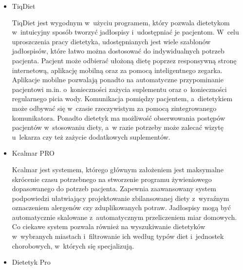\begin{itemize}
    \item TiqDiet

        TiqDiet\cite{url:TiqDiet} jest wygodnym w~użyciu programem, który pozwala dietetykom w~intuicyjny sposób tworzyć jadłospisy i~udostępniać je pacjentom.
        W~celu uproszczenia pracy dietetyka, udostępnianych jest wiele szablonów jadłospisów, które łatwo można dostosować do indywidualnych potrzeb pacjenta.
        Pacjent może odbierać ułożoną dietę poprzez responsywną stronę internetową, aplikację mobilną oraz za pomocą inteligentnego zegarka.
        Aplikacje mobilne pozwalają ponadto na automatyczne przypominanie pacjentowi m.in. o~konieczności zażycia suplementu oraz o~konieczności regularnego picia wody.
        Komunikacja pomiędzy pacjentem, a~dietetykiem może odbywać się w~czasie rzeczywistym za pomocą zintegrowanego komunikatora.
        Ponadto dietetyk ma możliwość obserwowania postępów pacjentów w~stosowaniu diety, a~w razie potrzeby może zalecać wizytę u~lekarza czy też zażycie dodatkowych suplementów.
%
    \item Kcalmar PRO

        Kcalmar\cite{url:kcalmar} jest systemem, którego głównym założeniem jest maksymalne skrócenie czasu potrzebnego na stworzenie programu żywieniowego dopasowanego do potrzeb pacjenta.
        Zapewnia zaawansowany system podpowiedzi ułatwiający projektowanie zbilansowanej diety z~wyraźnym oznaczeniem alergenów czy zduplikowanych potraw.
        Jadłospisy mogą być automatycznie skalowane z~automatycznym przeliczeniem miar domowych.
        Co ciekawe system pozwala również na wyszukiwanie dietetyków w~wybranych miastach i~filtrowanie ich według typów diet i~jednostek chorobowych, w~których się specjalizują.
%
    \item Dietetyk Pro


\end{itemize}
